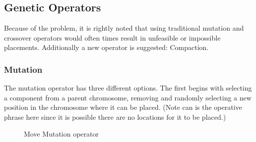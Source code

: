 \documentclass{article}
\begin{document}
\subsection{Genetic Operators}
Because of the problem, it is rightly noted that using traditional mutation and crossover operators would often times result in unfeasible or impossible placements. Additionally a new operator is suggested: Compaction. 

\subsubsection{Mutation}
The mutation operator has three different options. The first begins with selecting a component from a parent chromosome, removing and randomly selecting a new position in the chromosome where it can be placed. (Note can is the operative phrase here since it is possible there are no locations for it to be placed.) 

\begin{figure}[ht]
\centering
{}
\caption{Move Mutation operator}
\end{figure}
\end{document}
